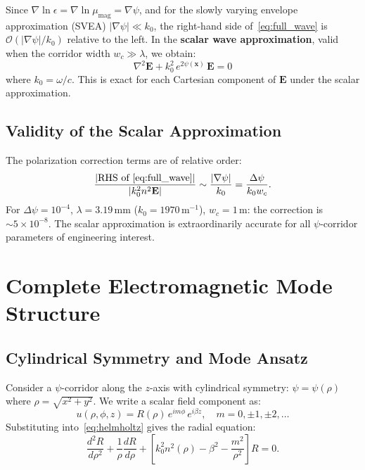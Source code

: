 \documentclass[journal,twocolumn]{IEEEtran}
\newcommand{\orderof}[1]{\mathcal{O}(#1)}
\begin{document}
Since $\nabla\ln\epsilon = \nabla\ln\mu_{\text{mag}} = \nabla\psi$,
and for the slowly varying envelope approximation (SVEA)
$|\nabla\psi| \ll k_0$, the right-hand side of~\eqref{eq:full_wave}
is $\orderof{|\nabla\psi|/k_0}$ relative to the left. In the
\textbf{scalar wave approximation}, valid when the corridor width
$w_c \gg \lambda$, we obtain:
\begin{equation}
\boxed{\nabla^2\mathbf{E} + k_0^2\,e^{2\psi(\mathbf{x})}\,\mathbf{E} = 0}
\label{eq:helmholtz}
\end{equation}
where $k_0 = \omega/c$. This is exact for each Cartesian component of
$\mathbf{E}$ under the scalar approximation.

\subsection{Validity of the Scalar Approximation}

The polarization correction terms are of relative order:
\begin{equation}
\frac{|\text{RHS of~\eqref{eq:full_wave}}|}{|k_0^2 n^2 \mathbf{E}|}
\sim \frac{|\nabla\psi|}{k_0}
= \frac{\Delta\psi}{k_0 w_c}.
\label{eq:scalar_validity}
\end{equation}
For $\Delta\psi = 10^{-4}$, $\lambda = 3.19\,\text{mm}$ ($k_0 = 1970\,\text{m}^{-1}$),
$w_c = 1\,\text{m}$: the correction is $\sim 5 \times 10^{-8}$.
The scalar approximation is extraordinarily accurate for all $\psi$-corridor
parameters of engineering interest.

\section{Complete Electromagnetic Mode Structure}\label{sec:modes}

\subsection{Cylindrical Symmetry and Mode Ansatz}

Consider a $\psi$-corridor along the $z$-axis with cylindrical symmetry:
$\psi = \psi(\rho)$ where $\rho = \sqrt{x^2 + y^2}$. We write a scalar
field component as:
\begin{equation}
u(\rho,\phi,z) = R(\rho)\,e^{im\phi}\,e^{i\beta z},
\quad m = 0, \pm1, \pm2, \ldots
\label{eq:mode_ansatz}
\end{equation}
Substituting into~\eqref{eq:helmholtz} gives the radial equation:
\begin{equation}
\frac{d^2R}{d\rho^2} + \frac{1}{\rho}\frac{dR}{d\rho}
+ \left[k_0^2 n^2(\rho) - \beta^2 - \frac{m^2}{\rho^2}\right]R = 0.
\label{eq:radial}
\end{equation}
\end{document}
